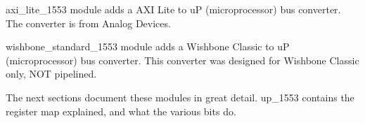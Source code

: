 \par
axi\_lite\_1553 module adds a AXI Lite to uP (microprocessor) bus converter. The converter is
from Analog Devices.

\par
wishbone\_standard\_1553 module adds a Wishbone Classic to uP (microprocessor) bus converter. This
converter was designed for Wishbone Classic only, NOT pipelined.

\vspace{15mm}
\par
The next sections document these modules in great detail. up\_1553 contains the register map explained, and what the various bits do.

